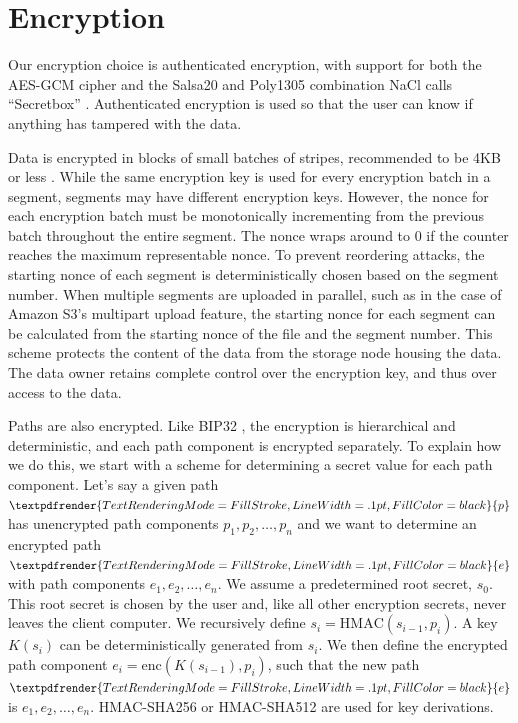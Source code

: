 \documentclass[8pt,fleqn,openany]{book}
\newcommand{\semibold}[1]{\textpdfrender{TextRenderingMode=FillStroke,LineWidth=.1pt,FillColor=black}{#1}}
\begin{document}
\section{Encryption}\label{sec:concrete-encryption}

Our encryption choice is authenticated encryption, with support for both the
AES-GCM cipher and the Salsa20 and Poly1305 combination NaCl calls ``Secretbox''
\cite{nacl-crypto}. Authenticated encryption is used so that the user can know
if anything has tampered with the data.

Data is encrypted in blocks of small batches of stripes, recommended to be
4KB or less \cite{nacl-packetlen}. While the same encryption key is used for
every encryption batch in a segment, segments may have
different encryption keys. However, the nonce for each encryption
batch must be monotonically incrementing from the previous batch throughout the
entire segment. The nonce wraps around to 0 if the counter reaches the
maximum representable nonce.
To prevent reordering attacks, the starting nonce of each
segment is deterministically chosen based on the segment number.
When multiple segments are uploaded in parallel, such as in the case of
Amazon S3's multipart upload feature, the starting nonce for each segment can be
calculated from the starting nonce of the file and the segment number.
This scheme protects the
content of the data from the storage node housing the data. The data owner
retains complete control over the encryption key, and thus over access to the
data.


Paths are also encrypted. Like
BIP32 \cite{bip32}, the encryption is hierarchical and deterministic, and
each path component is encrypted separately. To explain how we do this,
we start with a scheme for determining a secret value for each path
component.
Let's say a given path $\semibold{p}$ has unencrypted path components
$p_1, p_2, \ldots, p_n$
and we want to determine an encrypted path $\semibold{e}$ with path components
$e_1, e_2, \ldots, e_n$.
We assume a predetermined root secret, $s_0$. This root secret is chosen
by the user and, like all other encryption secrets, never leaves the client
computer. We recursively define
$s_i = \mbox{HMAC}(s_{i-1}, p_i)$.
A key $K(s_i)$ can be deterministically generated from $s_i$.
We then define the encrypted path component
$e_i = \mbox{enc}(K(s_{i-1}), p_i)$, such that the new path
$\semibold{e}$ is $e_1, e_2, \ldots, e_n$.
HMAC-SHA256 or HMAC-SHA512 are used for key derivations.
\end{document}
